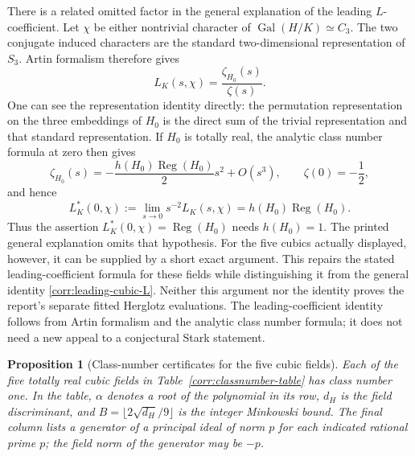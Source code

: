 \documentclass[11pt,a4paper]{article}
\newtheorem{proposition}[theorem]{Proposition}
\theoremstyle{definition}
\theoremstyle{remark}
\numberwithin{equation}{section}
\begin{document}
There is a related omitted factor in the general explanation of the
leading $L$-coefficient.  Let $\chi$ be either nontrivial character of
$\operatorname{Gal}(H/K)\simeq C_3$.  The two conjugate induced
characters are the standard two-dimensional representation of $S_3$.
Artin formalism therefore gives
\begin{equation}\label{corr:artin-cubic}
 L_K(s,\chi)=\frac{\zeta_{H_0}(s)}{\zeta(s)}.
\end{equation}
One can see the representation identity directly: the permutation
representation on the three embeddings of $H_0$ is the direct sum
of the trivial representation and that standard representation.
If $H_0$ is totally real, the analytic class number formula at zero
then gives \cite{MilneCFT}
\[
 \zeta_{H_0}(s)=-\frac{h(H_0)\operatorname{Reg}(H_0)}{2}s^2+O(s^3),
 \qquad \zeta(0)=-\frac12,
\]
and hence
\begin{equation}\label{corr:leading-cubic-L}
 L_K^*(0,\chi):=\lim_{s\to0}s^{-2}L_K(s,\chi)
            =h(H_0)\operatorname{Reg}(H_0).
\end{equation}
Thus the assertion $L_K^*(0,\chi)=\operatorname{Reg}(H_0)$ needs
$h(H_0)=1$.  The printed general explanation omits that hypothesis.
For the five cubics actually displayed, however, it can be supplied
by a short exact argument.  This repairs the stated leading-coefficient
formula for these fields while distinguishing it from the general
identity \eqref{corr:leading-cubic-L}.  Neither this argument nor the
identity proves the report's separate fitted Herglotz evaluations.
The leading-coefficient identity follows from Artin formalism and the
analytic class number formula; it does not need a new appeal to a
conjectural Stark statement.

\begin{proposition}[Class-number certificates for the five cubic fields]
\label{corr:cubic-class-numbers}
Each of the five totally real cubic fields in
Table~\ref{corr:classnumber-table} has class number one.  In the table,
$\alpha$ denotes a root of the polynomial in its row, $d_H$ is the
field discriminant, and $B=\lfloor 2\sqrt{d_H}/9\rfloor$ is the
integer Minkowski bound.  The final column lists a generator of a
principal ideal of norm $p$ for each indicated rational prime $p$;
the field norm of the generator may be $-p$.
\end{proposition}
\end{document}
